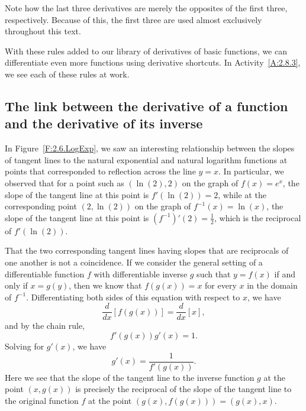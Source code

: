 Note how the last three derivatives are merely the opposites of the first three, respectively. Because of this, the first three are used almost exclusively throughout this text. 

With these rules added to our library of derivatives of basic functions, we can differentiate even more functions using derivative shortcuts.  In Activity~\ref{A:2.8.3}, we see each of these rules at work.


\subsection*{The link between the derivative of a function and the derivative of its inverse}

In Figure~\ref{F:2.6.LogExp}, we saw an interesting relationship between the slopes of tangent lines to the natural exponential and natural logarithm functions at points that corresponded to reflection across the line $y = x$.  In particular, we observed that for a point such as $(\ln(2), 2)$ on the graph of $f(x) = e^x$, the slope of the tangent line at this point is $f'(\ln(2)) = 2$, while at the corresponding point $(2, \ln(2))$ on the graph of $f^{-1}(x) = \ln(x)$, the slope of the tangent line at this point is $(f^{-1})'(2) = \frac{1}{2}$, which is the reciprocal of $f'(\ln(2))$.

That the two corresponding tangent lines having slopes that are reciprocals of one another is not a coincidence.  If we consider the general setting of a differentiable function $f$ with differentiable inverse $g$ such that $y = f(x)$ if and only if $x = g(y)$, then we know that $f(g(x)) = x$ for every $x$ in the domain of $f^{-1}$.  Differentiating both sides of this equation with respect to $x$, we have
$$\frac{d}{dx} [f(g(x))] = \frac{d}{dx} [x],$$
and by the chain rule,
$$f'(g(x)) g'(x) = 1.$$
Solving for $g'(x)$, we have 
$$g'(x) = \frac{1}{f'(g(x))}.$$
Here we see that the slope of the tangent line to the inverse function $g$ at the point $(x,g(x))$ is precisely the reciprocal of the slope of the tangent line to the original function $f$ at the point $(g(x),f(g(x))) = (g(x),x)$.

